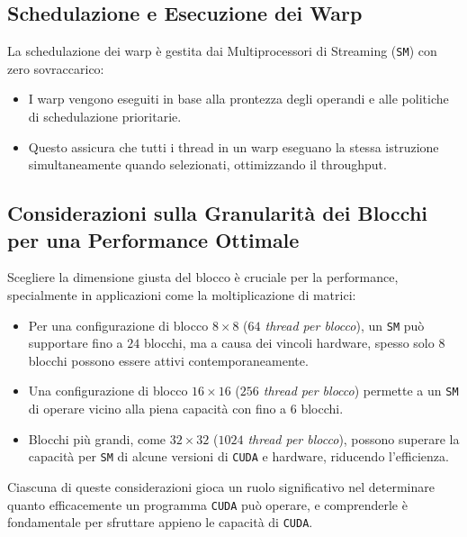 \subsection{Schedulazione e Esecuzione dei Warp}
La schedulazione dei warp è gestita dai Multiprocessori di Streaming
(\texttt{SM}) con zero sovraccarico:
\begin{itemize}
    \item I warp vengono eseguiti in base alla prontezza degli operandi
    e alle politiche di schedulazione prioritarie.
    \item Questo assicura che tutti i thread in un warp eseguano
    la stessa istruzione simultaneamente quando selezionati, ottimizzando il throughput.
\end{itemize}

\subsection{Considerazioni sulla Granularità dei Blocchi per una
Performance Ottimale}
Scegliere la dimensione giusta del blocco è cruciale per la performance,
specialmente in applicazioni come la moltiplicazione di matrici:
\begin{itemize}
    \item Per una configurazione di blocco $8 \times 8$
    (\textit{$64$ thread per blocco}), un \texttt{SM} può supportare
    fino a $24$ blocchi, ma a causa dei vincoli hardware, spesso solo
    $8$ blocchi possono essere attivi contemporaneamente.
    \item Una configurazione di blocco $16 \times 16$
    (\textit{$256$ thread per blocco}) permette a un \texttt{SM}
    di operare vicino alla piena capacità con fino a $6$ blocchi.
    \item Blocchi più grandi, come $32 \times 32$
    (\textit{$1024$ thread per blocco}), possono superare la
    capacità per \texttt{SM} di alcune versioni di \texttt{CUDA}
    e hardware, riducendo l'efficienza.
\end{itemize}

Ciascuna di queste considerazioni gioca un ruolo significativo nel
determinare quanto efficacemente un programma \texttt{CUDA} può operare, e comprenderle è fondamentale per sfruttare appieno le capacità di \texttt{CUDA}.
